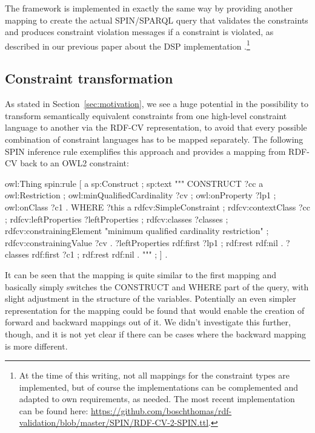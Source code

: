 \documentclass[a4paper,fontsize=11pt]{scrartcl}
\begin{document}
The framework is implemented in exactly the same way by providing another mapping to create the actual SPIN/SPARQL query that validates the constraints and produces constraint violation messages if a constraint is violated, as described in our previous paper about the DSP implementation \cite{BoschEckert2014-2}.\footnote{At the time of this writing, not all mappings for the constraint types are implemented, but of course the implementations can be complemented and adapted to own requirements, as needed. The most recent implementation can be found here: \url{https://github.com/boschthomas/rdf-validation/blob/master/SPIN/RDF-CV-2-SPIN.ttl}.}

\subsection{Constraint transformation}

As stated in Section~\ref{sec:motivation}, we see a huge potential in the possibility to transform semantically equivalent constraints from one high-level constraint language to another via the RDF-CV representation, to avoid that every possible combination of constraint languages has to be mapped separately. The following SPIN inference rule exemplifies this approach and provides a mapping from RDF-CV back to an OWL2 constraint:


\begin{ex}
owl:Thing 
    spin:rule [ a sp:Construct ; sp:text """
        CONSTRUCT {            
            ?cc
                a owl:Restriction ;
                owl:minQualifiedCardinality ?cv ;
                owl:onProperty ?lp1 ;
                owl:onClass ?c1 . }
        WHERE { 
            ?this
                a rdfcv:SimpleConstraint ;
                rdfcv:contextClass ?cc ;
                rdfcv:leftProperties ?leftProperties ;
                rdfcv:classes ?classes ;
                rdfcv:constrainingElement "minimum qualified cardinality restriction" ;
                rdfcv:constrainingValue ?cv .  
            ?leftProperties 
                rdf:first ?lp1 ;
                rdf:rest rdf:nil .    
            ?classes 
                rdf:first ?c1 ;
                rdf:rest rdf:nil . } """ ; ] .
\end{ex}

It can be seen that the mapping is quite similar to the first mapping and basically simply switches the CONSTRUCT and WHERE part of the query, with slight adjustment in the structure of the variables. Potentially an even simpler representation for the mapping could be found that would enable the creation of forward and backward mappings out of it. We didn't investigate this further, though, and it is not yet clear if there can be cases where the backward mapping is more different.
\end{document}
